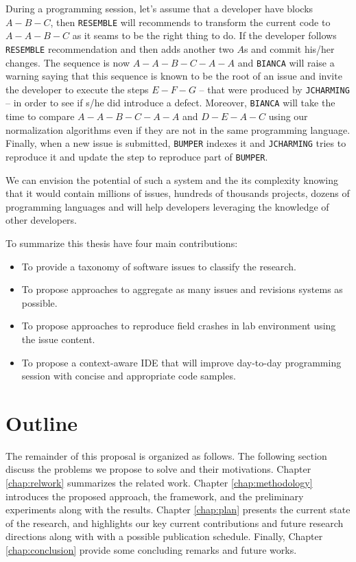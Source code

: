 During a programming session, let's assume that a developer have blocks $A-B-C$, then {\tt RESEMBLE} will recommends to transform the current code to $A-A-B-C$ as it seams to be the right thing to do.
If the developer follows {\tt RESEMBLE} recommendation and then adds another two $A$s and commit his/her changes.
The sequence is now $A-A-B-C-A-A$ and {\tt BIANCA} will raise a warning saying that this sequence is known to be the root of an issue and invite the developer to execute the steps $E-F-G$ -- that were produced by {\tt JCHARMING} -- in order to see if s/he did introduce a defect. Moreover, {\tt BIANCA} will take the time to compare $A-A-B-C-A-A$ and $D-E-A-C$ using our normalization algorithms even if they are not in the same programming language.
Finally, when a new issue is submitted, {\tt BUMPER} indexes it and {\tt JCHARMING} tries to reproduce it and update the step to reproduce part of {\tt BUMPER}.

We can envision the potential of such a system and the its complexity knowing that it would contain millions of issues, hundreds of thousands projects, dozens of programming languages and will help developers leveraging the knowledge of other developers.

To summarize this thesis have four main contributions:

\begin{itemize}
	\item To provide a taxonomy of software issues to classify the research.
	\item To propose approaches to aggregate as many issues and revisions systems as possible.
	\item To propose approaches to reproduce field crashes in lab environment using the issue content.
	\item To propose a context-aware IDE that will improve day-to-day programming session with concise and appropriate code samples.
\end{itemize}



\section{Outline\label{sec:outline}}

The remainder of this proposal is organized as follows. The following section discuss the problems we propose to solve and their motivations. Chapter \ref{chap:relwork} summarizes the related work.
Chapter \ref{chap:methodology} introduces the proposed approach, the framework, and the preliminary experiments along with the results.
Chapter \ref{chap:plan} presents the current state of the research, and highlights our key current contributions and future research directions along with with a possible publication schedule.
Finally, Chapter \ref{chap:conclusion} provide some concluding remarks and future works.
